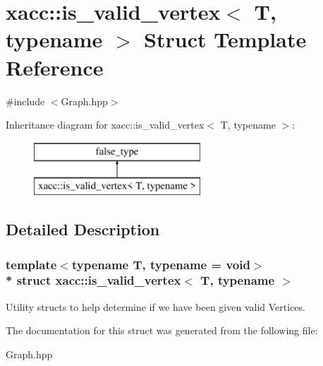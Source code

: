 \hypertarget{a00043}{}\section{xacc\+:\+:is\+\_\+valid\+\_\+vertex$<$ T, typename $>$ Struct Template Reference}
\label{a00043}


{\ttfamily \#include $<$Graph.\+hpp$>$}

Inheritance diagram for xacc\+:\+:is\+\_\+valid\+\_\+vertex$<$ T, typename $>$\+:\begin{figure}[H]
\begin{center}
\leavevmode
\includegraphics[height=2.000000cm]{a00043}
\end{center}
\end{figure}


\subsection{Detailed Description}
\subsubsection*{template$<$typename T, typename = void$>$\\*
struct xacc\+::is\+\_\+valid\+\_\+vertex$<$ T, typename $>$}

Utility structs to help determine if we have been given valid Vertices. 

The documentation for this struct was generated from the following file\+:\begin{DoxyCompactItemize}
\item 
Graph.\+hpp\end{DoxyCompactItemize}

